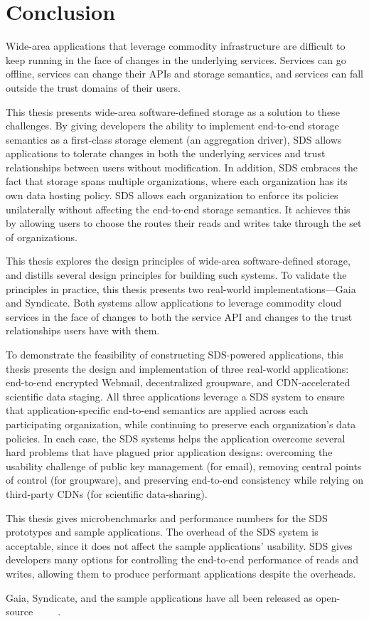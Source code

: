 \chapter{Conclusion}
\label{chap:conclusion}

Wide-area applications that leverage commodity infrastructure are difficult to
keep running in the face of changes in the underlying services.  Services can go
offline, services can change their APIs and storage semantics, and services can
fall outside the trust domains of their users.

This thesis presents wide-area software-defined storage as a solution to these
challenges.  By giving developers the ability to implement end-to-end
storage semantics as a first-class
storage element (an aggregation driver),
SDS allows applications to tolerate changes in both the underlying
services and trust relationships between users without modification.
In addition, SDS embraces the fact that storage spans multiple organizations,
where each organization has its own data hosting policy.  SDS allows each organization to enforce
its policies unilaterally without affecting the end-to-end storage semantics.  It
achieves this by allowing users to choose the routes their reads and writes take
through the set of organizations.

This thesis explores the design principles of wide-area software-defined storage, and
distills several design principles for building such systems.  To validate the
principles in practice, this thesis presents two real-world
implementations---Gaia and Syndicate.  Both systems allow applications to
leverage commodity cloud services in the face of changes to both the service API
and changes to the trust relationships users have with them.

To demonstrate the feasibility of constructing SDS-powered applications, 
this thesis presents the design and implementation of three real-world applications:
end-to-end encrypted Webmail, decentralized groupware, and CDN-accelerated
scientific data staging.  All three applications leverage a SDS system to ensure
that application-specific end-to-end semantics are applied across each
participating organization, while continuing to preserve each organization's
data policies.  In each case, the SDS systems helps the application overcome several hard
problems that have plagued prior application designs:
overcoming the usability challenge of public key management (for email),
removing central points of control (for groupware), and preserving end-to-end
consistency while relying on third-party CDNs (for scientific data-sharing).

This thesis gives microbenchmarks and performance numbers for the SDS prototypes and
sample applications.  The overhead of the SDS system is acceptable,
since it does not affect the sample applications' usability.  SDS gives
developers many options for controlling the end-to-end performance of reads and
writes, allowing them to produce performant applications despite the overheads.

Gaia, Syndicate, and the sample applications have all been released as
open-source~\cite{blockstack-core}~\cite{syndicate-storage}~\cite{syndicatemail}~\cite{blockstack-todo}~\cite{blockstack-browser}.

